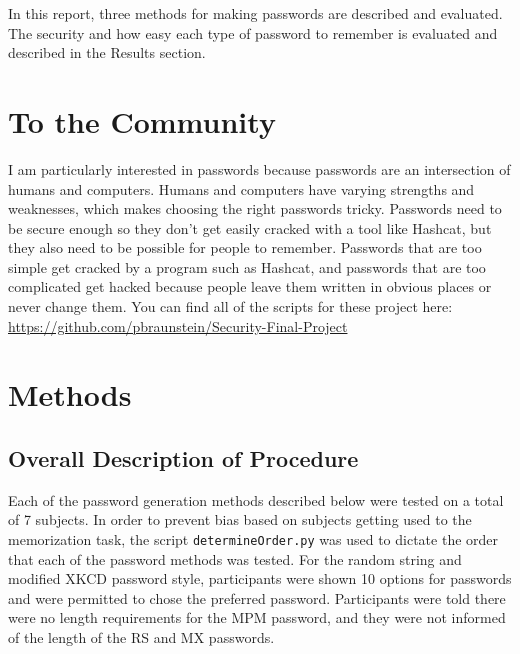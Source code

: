 \documentclass{article}
\begin{document}
In this report, three methods for making passwords are described and evaluated. The security and how easy each type of password to remember is evaluated and described in the Results section.

\section*{To the Community}
I am particularly interested in passwords because passwords are an intersection of humans and computers. Humans and computers have varying strengths and weaknesses, which makes choosing the right passwords tricky. Passwords need to be secure enough so they don't get easily cracked with a tool like Hashcat, but they also need to be possible for people to remember. Passwords that are too simple get cracked by a program such as Hashcat, and passwords that are too complicated get hacked because people leave them written in obvious places or never change them. You can find all of the scripts for these project here: \url{https://github.com/pbraunstein/Security-Final-Project}

\section*{Methods}
\subsection*{Overall Description of Procedure}
Each of the password generation methods described below were tested on a total of 7 subjects. In order to prevent bias based on subjects getting used to the memorization task, the script \texttt{determineOrder.py} was used to dictate the order that each of the password methods was tested. For the random string and modified XKCD password style, participants were shown 10 options for passwords and were permitted to chose the preferred password. Participants were told there were no length requirements for the MPM password, and they were not informed of the length of the RS and MX passwords.
\end{document}
